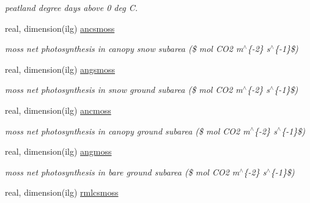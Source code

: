 \begin{DoxyCompactItemize}
\begin{DoxyCompactList}\small\item\em peatland degree days above 0 deg C. \end{DoxyCompactList}\item 
\hypertarget{structctem__statevars_1_1veg__gat_ae2173429a63a8e2139195d96bf0552f0}{}real, dimension(ilg) \hyperlink{structctem__statevars_1_1veg__gat_ae2173429a63a8e2139195d96bf0552f0}{ancsmoss}\label{structctem__statevars_1_1veg__gat_ae2173429a63a8e2139195d96bf0552f0}

\begin{DoxyCompactList}\small\item\em moss net photosynthesis in canopy snow subarea (\$ mol C\+O2 m$^\wedge$\{-\/2\} s$^\wedge$\{-\/1\}\$) \end{DoxyCompactList}\item 
\hypertarget{structctem__statevars_1_1veg__gat_a5ace9e04d5066c0e1d96d77705a3b2d1}{}real, dimension(ilg) \hyperlink{structctem__statevars_1_1veg__gat_a5ace9e04d5066c0e1d96d77705a3b2d1}{angsmoss}\label{structctem__statevars_1_1veg__gat_a5ace9e04d5066c0e1d96d77705a3b2d1}

\begin{DoxyCompactList}\small\item\em moss net photosynthesis in snow ground subarea (\$ mol C\+O2 m$^\wedge$\{-\/2\} s$^\wedge$\{-\/1\}\$) \end{DoxyCompactList}\item 
\hypertarget{structctem__statevars_1_1veg__gat_ad0719e0bacf49feb3220b223e064c3a6}{}real, dimension(ilg) \hyperlink{structctem__statevars_1_1veg__gat_ad0719e0bacf49feb3220b223e064c3a6}{ancmoss}\label{structctem__statevars_1_1veg__gat_ad0719e0bacf49feb3220b223e064c3a6}

\begin{DoxyCompactList}\small\item\em moss net photosynthesis in canopy ground subarea (\$ mol C\+O2 m$^\wedge$\{-\/2\} s$^\wedge$\{-\/1\}\$) \end{DoxyCompactList}\item 
\hypertarget{structctem__statevars_1_1veg__gat_a4dba5c3219b9a00eb9703d3a0e17a4d0}{}real, dimension(ilg) \hyperlink{structctem__statevars_1_1veg__gat_a4dba5c3219b9a00eb9703d3a0e17a4d0}{angmoss}\label{structctem__statevars_1_1veg__gat_a4dba5c3219b9a00eb9703d3a0e17a4d0}

\begin{DoxyCompactList}\small\item\em moss net photosynthesis in bare ground subarea (\$ mol C\+O2 m$^\wedge$\{-\/2\} s$^\wedge$\{-\/1\}\$) \end{DoxyCompactList}\item 
\hypertarget{structctem__statevars_1_1veg__gat_a67762db2e026c84ab4c1f888d1a716a1}{}real, dimension(ilg) \hyperlink{structctem__statevars_1_1veg__gat_a67762db2e026c84ab4c1f888d1a716a1}{rmlcsmoss}\label{structctem__statevars_1_1veg__gat_a67762db2e026c84ab4c1f888d1a716a1}


\end{DoxyCompactItemize}
